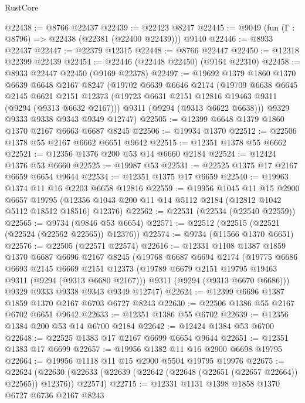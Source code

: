 \begin{lexlean}{RustCore}
\begin{coremodule}
@22438 := @8766 @22437
@22439 := @22423 @8247
@22445 := @9049 (fun (Γ : @8796) => @22438 (@22381 (@22400 @22439))) @9140
@22446 := @8933 @22437
@22447 := @22379 @12315
@22448 := @8766 @22447
@22450 := @12318 @22399 @22439
@22454 := @22446 (@22448 @22450) (@9164 @22310)
@22458 := @8933 @22447 @22450 (@9169 @22378)
@22497 := @19692
    @1379
    @1860
    @1370
    @6639
    @6648
    @2167
    @8247
    (@19702
      @6639
      @6646
      @2174
      (@19709
        @6638
        @6645
        @2145
        @6621
        @2151
        @12373
        (@19723 @6631 @2151 @12816 @19463 @9311 (@9294 (@9313 @6632 @2167)))
        @9311
        (@9294 (@9313 @6622 @6638)))
      @9329
      @9333
      @9338
      @9343
      @9349
      @12747)
@22505 := @12399 @6648 @1379 @1860 @1370 @2167 @6663 @6687 @8245
@22506 := @19934 @1370
@22512 := @22506 @1378 @55 @2167 @6662 @6651 @9642
@22515 := @12351 @1378 @55 @6662
@22521 := @12356 @1376 @200 @53 @14 @6660 @2184
@22524 := @12424 @1376 @53 @6660
@22525 := @19987 @53
@22531 := @22525 @1375 @17 @2167 @6659 @6654 @9644
@22534 := @12351 @1375 @17 @6659
@22540 := @19963 @1374 @11 @16 @2203 @6658 @12816
@22559 := @19956
    @1045
    @11
    @15
    @2900
    @6657
    @19795
    (@12356 @1043 @200 @11 @14 @5112 @2184 (@12812 @1042 @5112 @18512 @18516) @12376)
@22562 := @22531 (@22534 (@22540 @22559))
@22565 := @9734 (@9846 @53 @6654)
@22571 := @22512 (@22515 (@22521 (@22524 (@22562 @22565)) @12376))
@22574 := @9734 (@11566 @1370 @6651)
@22576 := @22505 (@22571 @22574)
@22616 := @12331
    @1108
    @1387
    @1859
    @1370
    @6687
    @6696
    @2167
    @8245
    (@19768
      @6687
      @6694
      @2174
      (@19775
        @6686
        @6693
        @2145
        @6669
        @2151
        @12373
        (@19789 @6679 @2151 @19795 @19463 @9311 (@9294 (@9313 @6680 @2167)))
        @9311
        (@9294 (@9313 @6670 @6686)))
      @9329
      @9333
      @9338
      @9343
      @9349
      @12747)
@22624 := @12399 @6696 @1387 @1859 @1370 @2167 @6703 @6727 @8243
@22630 := @22506 @1386 @55 @2167 @6702 @6651 @9642
@22633 := @12351 @1386 @55 @6702
@22639 := @12356 @1384 @200 @53 @14 @6700 @2184
@22642 := @12424 @1384 @53 @6700
@22648 := @22525 @1383 @17 @2167 @6699 @6654 @9644
@22651 := @12351 @1383 @17 @6699
@22657 := @19956 @1382 @11 @16 @2900 @6698 @19795
@22664 := @19956 @1118 @11 @15 @2900 @5504 @19795 @19976
@22675 := @22624
    (@22630 (@22633 (@22639 (@22642 (@22648 (@22651 (@22657 @22664)) @22565)) @12376)) @22574)
@22715 := @12331
    @1131
    @1398
    @1858
    @1370
    @6727
    @6736
    @2167
    @8243

\end{coremodule}
\end{lexlean}
